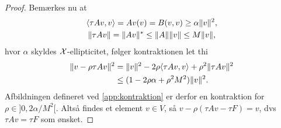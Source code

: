 \begin{proof}
Bemærkes nu at
\begin{gather}
\langle \tau Av,v \rangle = Av(v) = B(v,v) \geq \alpha \|v\|^2, \\
\|\tau Av\| = \|Av\|^{\ast} \leq \|A\|\|v\| \leq M\|v\|,
\end{gather}
hvor $\alpha$ skyldes $\mathcal{X}$-ellipticitet, følger kontraktionen let thi
\begin{align}
\|v-\rho \tau Av\|^2 & = \|v\|^2 - 2\rho \langle \tau Av,v \rangle
                         + {\rho}^2 \|\tau Av\|^2 \\
                     & \leq (1-2\rho \alpha + {\rho}^2 M^2) \|v\|^2.
\end{align}
Afbildningen defineret ved \eqref{app:kontraktion} er derfor en
kontraktion for $\rho \in ]0,2\alpha /M^2[$. Altså findes et
element $v \in V$, så $v-\rho(\tau Av - \tau F)=v$, dvs $\tau Av = \tau
F$ som ønsket.  
\end{proof}

